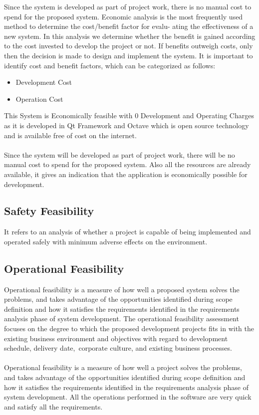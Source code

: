 Since the system is developed as part of project work, there is no manual cost to spend for the proposed system. 
\noindent Economic analysis is the most frequently used method to determine the cost/benefit factor for evalu-
ating the effectiveness of a new system. In this analysis we determine whether the benefit is gained
according to the cost invested to develop the project or not. If benefits outweigh costs, only then
the decision is made to design and implement the system. It is important to identify cost and benefit
factors, which can be categorized as follows:
\begin{itemize}
\item Development Cost
\item Operation Cost
\end{itemize}
This System is Economically feasible with 0 Development and Operating Charges
as it is developed in Qt Framework and Octave which is open source technology and is available free of cost on the internet.\\\\
Since the system will be developed as part of project work, there will be no manual cost to spend for the proposed system. Also all the resources are already available, it gives an indication that the application is economically possible for development.

\subsection{Safety Feasibility}
\noindent It refers to an analysis of whether a project is capable of being implemented
and operated safely with minimum adverse effects on the environment.

\subsection{Operational Feasibility}
Operational feasibility is a measure of how well a proposed system solves the problems, and takes advantage of the opportunities identified during scope definition and how it satisfies the requirements identified in the requirements analysis phase of system development. The operational feasibility assessment focuses on the degree to which the proposed development projects fits in with the existing business environment and objectives with regard to development schedule, delivery date, corporate culture, and existing business processes.\\\\
\noindent Operational feasibility is a measure of how well a project solves the problems, and takes advantage of
the opportunities identified during scope definition and how it satisfies the requirements identified in
the requirements analysis phase of system development. All the operations performed in the software
are very quick and satisfy all the requirements.

